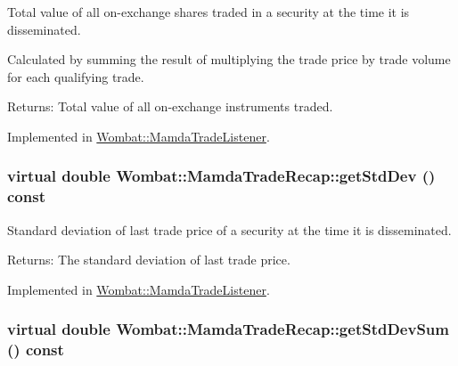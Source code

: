 Total value of all on-exchange shares traded in a security at the time it is disseminated. 

Calculated by summing the result of multiplying the trade price by trade volume for each qualifying trade.

\begin{Desc}
\item[Returns:]Total value of all on-exchange instruments traded. \end{Desc}


Implemented in \hyperlink{classWombat_1_1MamdaTradeListener_b9865f1c180226bf4f9c30efb9a996ab}{Wombat::Mamda\-Trade\-Listener}.\hypertarget{classWombat_1_1MamdaTradeRecap_388ccb8e0d7bbc9be4c2fbdbef376aa8}{
\subsubsection[getStdDev]{\setlength{\rightskip}{0pt plus 5cm}virtual double Wombat::Mamda\-Trade\-Recap::get\-Std\-Dev () const}}
\label{classWombat_1_1MamdaTradeRecap_388ccb8e0d7bbc9be4c2fbdbef376aa8}


Standard deviation of last trade price of a security at the time it is disseminated. 

\begin{Desc}
\item[Returns:]The standard deviation of last trade price. \end{Desc}


Implemented in \hyperlink{classWombat_1_1MamdaTradeListener_52d70de1c585fa3d02f31fb963b2788a}{Wombat::Mamda\-Trade\-Listener}.\hypertarget{classWombat_1_1MamdaTradeRecap_65b971acc07bbbc6f593b7e7a803e6c4}{
\subsubsection[getStdDevSum]{\setlength{\rightskip}{0pt plus 5cm}virtual double Wombat::Mamda\-Trade\-Recap::get\-Std\-Dev\-Sum () const}}
\label{classWombat_1_1MamdaTradeRecap_65b971acc07bbbc6f593b7e7a803e6c4}


